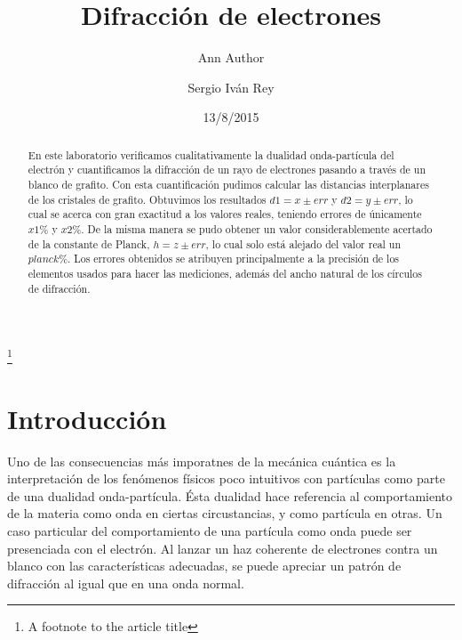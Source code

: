 \documentclass[%
 reprint,
 amsmath,amssymb,
 aps,
]{revtex4-1}
\begin{document}

\title{Difracción de electrones}%
\thanks{A footnote to the article title}%

\author{Ann Author}
\author{Sergio Iv\'an Rey}%
%

\date{13/8/2015}%

\begin{abstract}
En este laboratorio verificamos cualitativamente la dualidad onda-partícula del electrón y cuantificamos la difracción de un rayo de electrones pasando a través de un blanco de grafito. Con esta cuantificación pudimos calcular las distancias interplanares de los cristales de grafito. Obtuvimos los resultados $d1 = x \pm err$ y $d2 = y \pm err$, lo cual se acerca con gran exactitud a los valores reales, teniendo errores de únicamente $ x1\%$ y $ x2\%$. De la misma manera se pudo obtener un valor considerablemente acertado de la constante de Planck, $ h = z \pm err $, lo cual solo está alejado del valor real un $ planck\% $. Los errores obtenidos se atribuyen principalmente a la precisión de los elementos usados para hacer las mediciones, además del ancho natural de los círculos de difracción.
\end{abstract}


\maketitle


\section{\label{sec:level1}Introducci\'on}
Uno de las consecuencias más imporatnes de la mecánica cuántica es la interpretación de los fenómenos físicos poco intuitivos con partículas como parte de una dualidad onda-partícula. Ésta dualidad hace referencia al comportamiento de la materia como onda en ciertas circustancias, y como partícula en otras. Un caso particular del comportamiento de una partícula como onda puede ser presenciada con el electrón. Al lanzar un haz coherente de electrones contra un blanco con las características adecuadas, se puede apreciar un patrón de difracción al igual que en una onda normal.\\
\end{document}
